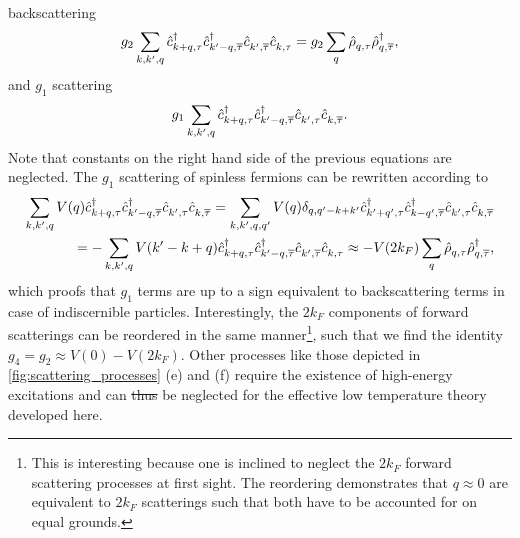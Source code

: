 \documentclass{svmono}
\def\pdag{{\vphantom\dag}}
\providecommand{\DIFdeltex}[1]{{\protect\color{red}\sout{#1}}}                      %
\providecommand{\DIFaddbegin}{} %
\providecommand{\DIFaddend}{} %
\providecommand{\DIFdelbegin}{} %
\providecommand{\DIFdelend}{} %
\providecommand{\DIFdel}[1]{\texorpdfstring{\DIFdeltex{#1}}{}} %
\newcommand{\DIFscaledelfig}{0.5}
\newlength{\DIFdelgraphicswidth} %
\newlength{\DIFdelgraphicsheight} %
\newcommand{\DIFaddincludegraphics}[2][]{{\color{blue}\fbox{\DIFOincludegraphics[#1]{#2}}}} %
\newcommand{\DIFdelincludegraphics}[2][]{%
\sbox{\DIFdelgraphicsbox}{\DIFOincludegraphics[#1]{#2}}%
\settoboxwidth{\DIFdelgraphicswidth}{\DIFdelgraphicsbox} %
\settoboxtotalheight{\DIFdelgraphicsheight}{\DIFdelgraphicsbox} %
\scalebox{\DIFscaledelfig}{%
\parbox[b]{\DIFdelgraphicswidth}{\usebox{\DIFdelgraphicsbox}\\[-\baselineskip] \rule{\DIFdelgraphicswidth}{0em}}\llap{\resizebox{\DIFdelgraphicswidth}{\DIFdelgraphicsheight}{%
\setlength{\unitlength}{\DIFdelgraphicswidth}%
\begin{picture}(1,1)%
\thicklines\linethickness{2pt} %
{\color[rgb]{1,0,0}\put(0,0){\framebox(1,1){}}}%
{\color[rgb]{1,0,0}\put(0,0){\line( 1,1){1}}}%
{\color[rgb]{1,0,0}\put(0,1){\line(1,-1){1}}}%
\end{picture}%
}\hspace*{3pt}}} %
} %
\DeclareRobustCommand{\DIFaddbegin}{\DIFOaddbegin \let\includegraphics\DIFaddincludegraphics} %
\DeclareRobustCommand{\DIFaddend}{\DIFOaddend \let\includegraphics\DIFOincludegraphics} %
\DeclareRobustCommand{\DIFdelbegin}{\DIFOdelbegin \let\includegraphics\DIFdelincludegraphics} %
\DeclareRobustCommand{\DIFdelend}{\DIFOaddend \let\includegraphics\DIFOincludegraphics} %
\begin{document}
backscattering
\DIFdelbegin %
\DIFdelend \DIFaddbegin \begin{align}
    g_2\sum_{k,k',q}\hat c^\dag_{k+q,\tau}\hat c^\dag_{k'-q,\overline\tau}\hat c^\pdag_{k',\overline\tau}\hat c^\pdag_{k,\tau} = g_2\sum_q \hat\rho^\pdag_{q,\tau}\hat\rho^\dag_{q,\overline\tau},
\end{align}\DIFaddend 
and $g_1$ scattering
\begin{align}
    g_1\sum_{k,k',q} \hat c^\dag_{k+q,\tau}\hat c^\dag_{k'-q,\overline\tau}\hat c^\pdag_{k',\tau}\hat c^\pdag_{k,\overline\tau}.
\end{align}
Note that constants on the right hand side of the previous equations are neglected.
The $g_1$ scattering of spinless fermions can be rewritten according to
\begin{align}
    \sum_{k,k',q}V(q)
    \hat c^\dag_{k+q,\tau}\hat c^\dag_{k'-q,\overline\tau}\hat c^\pdag_{k',\tau}\hat c^\pdag_{k,\overline\tau}
    =
    \sum_{k,k',q,q'}V(q) \delta_{q,q'-k+k'}
    \hat c^\dag_{k'+q',\tau}\hat c^\dag_{k-q',\overline\tau}\hat c^\pdag_{k',\tau}\hat c^\pdag_{k,\overline\tau}
    \\
    =
    -\sum_{k,k',q}V(k'-k+q)\hat c^\dag_{k+q,\tau}\hat c^\dag_{k'-q,\overline\tau}\hat c^\pdag_{k',\overline\tau}\hat c^\pdag_{k,\tau}
    \approx -V(2k_F)\sum_q\hat\rho^\pdag_{q,\tau}\hat\rho^\dag_{q,\overline\tau},
    \label{eq:umklapp_backscattering_equivalence}
\end{align}
which proofs that $g_1$ terms are up to a sign equivalent to backscattering terms in case of indiscernible particles.
Interestingly, the $2k_F$ components of forward scatterings can be reordered in the same manner\footnote{This is interesting because one is inclined to neglect the $2k_F$ forward scattering processes at first sight. The reordering demonstrates that $q\approx0$ are equivalent to $2k_F$ scatterings such that both have to be accounted for on equal grounds.}, such that we find the identity $g_4 = g_2 \approx V(0)-V(2k_F)$.
Other processes like those depicted in \cref{fig:scattering_processes} (e) and (f) require the existence of high-energy excitations and can \DIFdelbegin \DIFdel{thus }\DIFdelend be neglected for the effective low temperature theory developed here.
\end{document}
